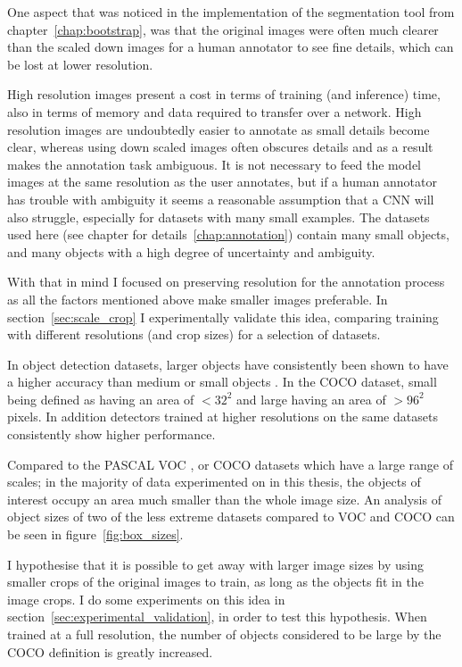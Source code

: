 One aspect that was noticed in the implementation of the segmentation tool from chapter~\ref{chap:bootstrap}, was that the original images were often much clearer than the scaled down images for a human annotator to see fine details, which can be lost at lower resolution. 

High resolution images present a cost in terms of training (and inference) time, also in terms of memory and data required to transfer over a network. High resolution images are undoubtedly easier to annotate as small details become clear, whereas using down scaled images often obscures details and as a result makes the annotation task ambiguous. It is not necessary to feed the model images at the same resolution as the user annotates, but if a human annotator has trouble with ambiguity it seems a reasonable assumption that a \gls{CNN} will also struggle, especially for datasets with many small examples. The datasets used here (see chapter for details~\ref{chap:annotation}) contain many small objects, and many objects with a high degree of uncertainty and ambiguity.

With that in mind I focused on preserving resolution for the annotation process as all the factors mentioned above make smaller images preferable. In section~\ref{sec:scale_crop} I experimentally validate this idea, comparing training with different resolutions (and crop sizes) for a selection of datasets.

In object detection datasets, larger objects have consistently been shown to have a higher accuracy than medium or small objects \cite{Lin2014, Wang2017, Lin2017a, Law2018, Zhou2019}. In the COCO dataset, small being defined as having an area of $<32^2$ and large having an area of $>96^2$ pixels. In addition detectors trained at higher resolutions on the same datasets consistently show higher performance.

 Compared to the PASCAL VOC \cite{Everingham2008}, or COCO \cite{Lin2014} datasets which have a large range of scales; in the majority of data experimented on in this thesis, the objects of interest occupy an area much smaller than the whole image size. An analysis of object sizes of two of the less extreme datasets compared to VOC and COCO can be seen in figure~\ref{fig:box_sizes}. 

I hypothesise that it is possible to get away with larger image sizes by using smaller crops of the original images to train, as long as the objects fit in the image crops. I do some experiments on this idea in section~\ref{sec:experimental_validation}, in order to test this hypothesis. When trained at a full resolution, the number of objects considered to be large by the COCO definition is greatly increased.

